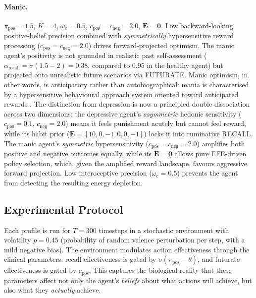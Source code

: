 \documentclass[11pt,a4paper]{article}
\begin{document}
\paragraph{Manic.} $\pi_{\text{pos}} = 1.5$, $K = 4$, $\omega_e = 0.5$, $c_{\text{pos}} = c_{\text{neg}} = 2.0$, $\mathbf{E} = \mathbf{0}$. Low backward-looking positive-belief precision combined with \emph{symmetrically} hypersensitive reward processing ($c_{\text{pos}} = c_{\text{neg}} = 2.0$) drives forward-projected optimism. The manic agent's positivity is not grounded in realistic past self-assessment ($\alpha_{\text{recall}} = \sigma(1.5 - 2) = 0.38$, compared to $0.95$ in the healthy agent) but projected onto unrealistic future scenarios via FUTURATE. Manic optimism, in other words, is anticipatory rather than autobiographical: mania is characterised by a hypersensitive behavioural approach system oriented toward anticipated rewards \citep{johnson2012behavioral, alloy2010role}. The distinction from depression is now a principled double dissociation across two dimensions: the depressive agent's \emph{asymmetric} hedonic sensitivity ($c_{\text{pos}} = 0.1$, $c_{\text{neg}} = 2.0$) means it feels punishment acutely but cannot feel reward, while its habit prior ($\mathbf{E} = [10, 0, -1, 0, 0, -1]$) locks it into ruminative RECALL. The manic agent's \emph{symmetric} hypersensitivity ($c_{\text{pos}} = c_{\text{neg}} = 2.0$) amplifies both positive and negative outcomes equally, while its $\mathbf{E} = \mathbf{0}$ allows pure EFE-driven policy selection, which, given the amplified reward landscape, favours aggressive forward projection. Low interoceptive precision ($\omega_e = 0.5$) prevents the agent from detecting the resulting energy depletion.

\subsection{Experimental Protocol}

Each profile is run for $T = 300$ timesteps in a stochastic environment with volatility $p = 0.45$ (probability of random valence perturbation per step, with a mild negative bias). The environment modulates action effectiveness through the clinical parameters: recall effectiveness is gated by $\sigma(\pi_{\text{pos}} - \theta)$, and futurate effectiveness is gated by $c_{\text{pos}}$. This captures the biological reality that these parameters affect not only the agent's \emph{beliefs} about what actions will achieve, but also what they \emph{actually} achieve.
\end{document}
